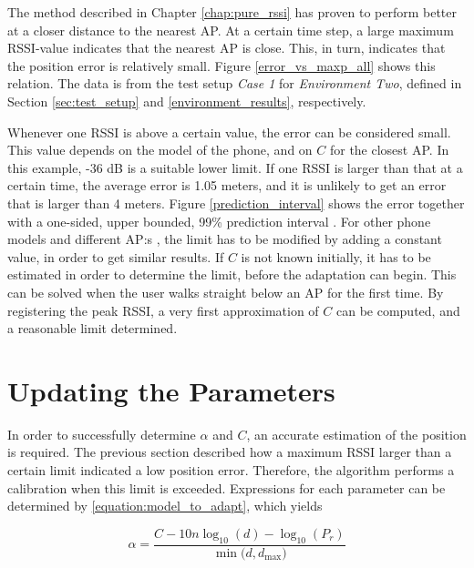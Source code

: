 \documentclass{LTHthesis}
\begin{document}
The method described in Chapter \ref{chap:pure_rssi} has proven to perform better at a closer distance to the nearest AP. At a certain time step, a large maximum RSSI-value indicates that the nearest AP is close. This, in turn, indicates that the position error is relatively small. Figure \ref{error_vs_maxp_all} shows this relation. The data is from the test setup \emph{Case 1} for \emph{Environment Two}, defined in Section \ref{sec:test_setup} and \ref{environment_results}, respectively.

Whenever one RSSI is above a certain value, the error can be considered small. This value depends on the model of the phone, and on $C$ for the closest AP. In this example, -36 dB is a suitable lower limit. If one RSSI is larger than that at a certain time, the average error is 1.05 meters, and it is unlikely to get an error that is larger than 4 meters. Figure \ref{prediction_interval} shows the error together with a one-sided, upper bounded, 99\% prediction interval \cite{matstat}. For other phone models and different AP:s , the limit has to be modified by adding a constant value, in order to get similar results. If $C$ is not known initially, it has to be estimated in order to determine the limit, before the adaptation can begin.  This can be solved when the user walks straight below an AP for the first time. By registering the peak RSSI, a very first approximation of $C$ can be computed, and a reasonable limit determined.

%
\section{Updating the Parameters} %
%
In order to successfully determine $\alpha$ and $C$, an accurate estimation of the position is required. The previous section described how a maximum RSSI larger than a certain limit indicated a low position error. Therefore, the algorithm performs a calibration when this limit is exceeded. Expressions for each parameter can be determined by \ref{equation:model_to_adapt}, which yields

%
\begin{equation}
\alpha=\frac{C-10n\log_{10}(d)-\log_{10}(P_r)}{\min({d, d_{\text{max}})}}
\label{equation:update_alpha}
\end{equation}
%
\end{document}
